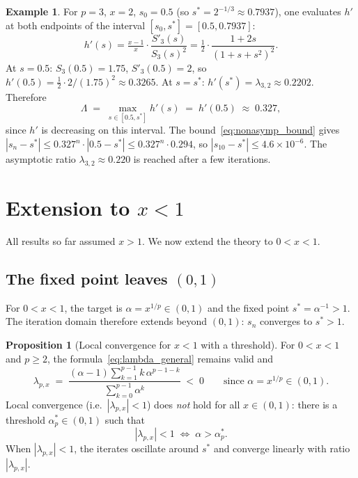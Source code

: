 \documentclass[11pt,a4paper]{article}
\theoremstyle{definition}
\newtheorem{proposition}{Proposition}[section]
\newtheorem{example}{Example}[section]
\begin{document}
\begin{example}
For $p = 3$, $x = 2$, $s_0 = 0.5$ (so $s^* = 2^{-1/3} \approx 0.7937$), one evaluates $h'$ at both endpoints of the interval $[s_0, s^*] = [0.5, 0.7937]$:
\[
  h'(s) = \tfrac{x-1}{x} \cdot \frac{S'_3(s)}{S_3(s)^2}
        = \tfrac{1}{2} \cdot \frac{1 + 2s}{(1 + s + s^2)^2}.
\]
At $s = 0.5$: $S_3(0.5) = 1.75$, $S'_3(0.5) = 2$, so $h'(0.5) = \tfrac{1}{2} \cdot 2/(1.75)^2 \approx 0.3265$. At $s = s^*$: $h'(s^*) = \lambda_{3,2} \approx 0.2202$. Therefore
\[
  \Lambda \;=\; \max_{s \in [0.5, s^*]} h'(s) \;=\; h'(0.5) \;\approx\; 0.327,
\]
since $h'$ is decreasing on this interval. The bound~\eqref{eq:nonasymp_bound} gives $|s_n - s^*| \leq 0.327^n \cdot |0.5 - s^*| \leq 0.327^n \cdot 0.294$, so $|s_{10} - s^*| \leq 4.6 \times 10^{-6}$. The asymptotic ratio $\lambda_{3,2} \approx 0.220$ is reached after a few iterations.
\end{example}

\section{Extension to \texorpdfstring{$x < 1$}{x < 1}}
\label{sec:extension_x_less_1}

All results so far assumed $x > 1$. We now extend the theory to $0 < x < 1$.

\subsection{The fixed point leaves $(0,1)$}

For $0 < x < 1$, the target is $\alpha = x^{1/p} \in (0,1)$ and the fixed point $s^* = \alpha^{-1} > 1$. The iteration domain therefore extends beyond $(0,1)$: $s_n$ converges to $s^* > 1$.

\begin{proposition}[Local convergence for $x < 1$ with a threshold]
\label{prop:x_small}
For $0 < x < 1$ and $p \geq 2$, the formula~\eqref{eq:lambda_general} remains valid and
\[
  \lambda_{p,x}
  \;=\; \frac{(\alpha - 1)\sum_{k=1}^{p-1}k\,\alpha^{p-1-k}}{\sum_{k=0}^{p-1}\alpha^k}
  \;<\; 0
  \qquad \text{since } \alpha = x^{1/p} \in (0,1).
\]
Local convergence (i.e.\ $|\lambda_{p,x}| < 1$) does \emph{not} hold for all $x \in (0,1)$: there is a threshold $\alpha^\ast_p \in (0,1)$ such that
\[
  |\lambda_{p,x}| < 1
  \;\iff\;
  \alpha > \alpha^\ast_p.
\]
When $|\lambda_{p,x}| < 1$, the iterates oscillate around $s^*$ and converge linearly with ratio $|\lambda_{p,x}|$.
\end{proposition}
\end{document}
